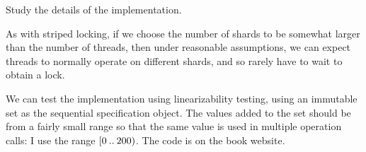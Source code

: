 \begin{instruction}
Study the details of the implementation.
\end{instruction}

As with striped locking, if we choose the number of shards to be somewhat
larger than the number of threads, then under reasonable assumptions, we can
expect threads to normally operate on different shards, and so rarely have to
wait to obtain a lock. 

We can test the implementation using linearizability testing, using an
immutable set as the sequential specification object.  The values added to the
set should be from a fairly small range so that the same value is used in
multiple operation calls: I use the range $[0 \mathbin{..} 200)$.  The code is on
the book website.

